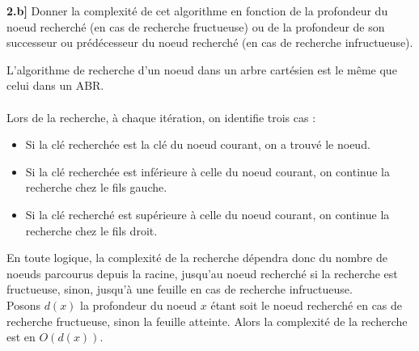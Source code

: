 \documentclass[a4paper,12pt]{report}
\begin{document}
\vspace{1.5cm}

\textbf{2.b]} Donner la complexité de cet algorithme en fonction de la profondeur du noeud recherché (en cas de recherche fructueuse) ou de la profondeur de son successeur ou prédécesseur du noeud recherché (en cas de recherche infructueuse).



\begin{tcolorbox}[colback=gray!10, colframe=blue!30, coltitle=black, title=Réponse à la 2.b - 1/2]

    L'algorithme de recherche d'un noeud dans un arbre cartésien est le même que celui dans un ABR.\\\\[-0.4cm]

    Lors de la recherche, à chaque itération, on identifie trois cas :
    \begin{itemize}
        \item Si la clé recherchée est la clé du noeud courant, on a trouvé le noeud.
        \item Si la clé recherchée est inférieure à celle du noeud courant, on continue la recherche chez le fils gauche.
        \item Si la clé recherché est supérieure à celle du noeud courant, on continue la recherche chez le fils droit.
    \end{itemize}

    \vspace{0.5cm}

    En toute logique, la complexité de la recherche dépendra donc du nombre de noeuds parcourus depuis la racine, jusqu'au noeud recherché si la recherche est fructueuse, sinon, jusqu'à une feuille en cas de recherche infructueuse.\\

    Posons \( d(x) \) la profondeur du noeud \( x \) étant soit le noeud recherché en cas de recherche fructueuse, sinon la feuille atteinte. Alors la complexité de la recherche est en \( O(d(x)) \).\\
\end{tcolorbox}
\end{document}
